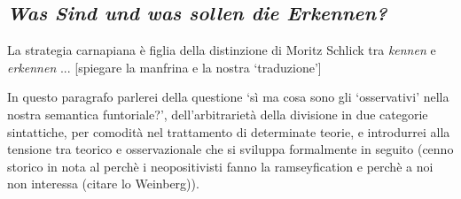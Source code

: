 \subsection{\emph{Was Sind und was sollen die Erkennen?}}

La strategia carnapiana è figlia della distinzione di Moritz Schlick \cite{.} tra \emph{kennen} e \emph{erkennen} ... [spiegare la manfrina e la nostra `traduzione']

In questo paragrafo parlerei della questione `sì ma cosa sono gli `osservativi' nella nostra semantica funtoriale?', dell'arbitrarietà della divisione in due categorie sintattiche, per comodità nel trattamento di determinate teorie, e introdurrei alla tensione tra teorico e osservazionale che si sviluppa formalmente in seguito (cenno storico in nota al perchè i neopositivisti fanno la ramseyfication e perchè a noi non interessa (citare lo Weinberg)).

